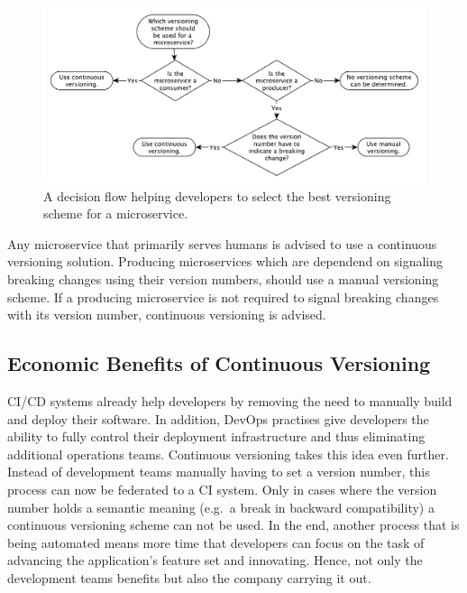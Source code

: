 \begin{figure}[H]
\begin{center}
  \includegraphics[scale=0.55]{images/figures/versioning_decision_flow.pdf}
\end{center}
\caption{A decision flow helping developers to select the best versioning
  scheme for a microservice.}%
\label{fig:versioning_decision_flow}
\end{figure}

Any microservice that primarily serves humans is advised to use a continuous
versioning solution. Producing microservices which are dependend on signaling
breaking changes using their version numbers, should use a manual versioning
scheme. If a producing microservice is not required to signal breaking changes
with its version number, continuous versioning is advised.

\subsection{Economic Benefits of Continuous Versioning}%
\label{sub:Economic_Benefits_of_Continuous_Versioning}
\ac{CI}/\ac{CD} systems already help developers by removing the need to
manually build and deploy their software. In addition, DevOps practises give
developers the ability to fully control their deployment infrastructure and
thus eliminating additional operations teams. Continuous versioning takes this
idea even further. Instead of development teams manually having to set a
version number, this process can now be federated to a \ac{CI} system. Only in
cases where the version number holds a semantic meaning (e.g.\ a break in
backward compatibility) a continuous versioning scheme can not be used. In the
end, another process that is being automated means more time that developers can
focus on the task of advancing the application's feature set and innovating.
Hence, not only the development teams benefits but also the company carrying it
out.
